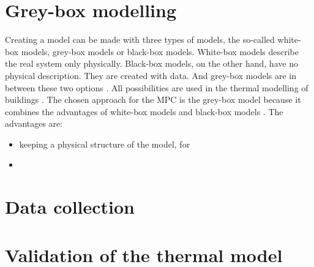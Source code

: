 \section{Grey-box modelling}
\label{Grey-box modelling}

Creating a model can be made with three types of models, the so-called white-box models, grey-box models or black-box models. White-box models describe the real system only physically. Black-box models, on the other hand, have no physical description. They are created with data. And grey-box models are in between these two options \cite{Statusseminar.ForschungfurEnergieoptimiertesBauen.2009}. All possibilities are used in the thermal modelling of buildings \cite{Kramer.2012}.
\newline
The chosen approach for the MPC is the grey-box model because it combines the advantages of white-box models and black-box models \cite{EstradaFlores.2006}. The advantages are: \cite{Coakley.2014}
\begin{itemize}
 \item keeping a physical structure of the model, for 
 \item 
\end{itemize}


\section{Data collection}
\label{datacollection}

\section{Validation of the thermal model}
\label{validationthermalmodel}